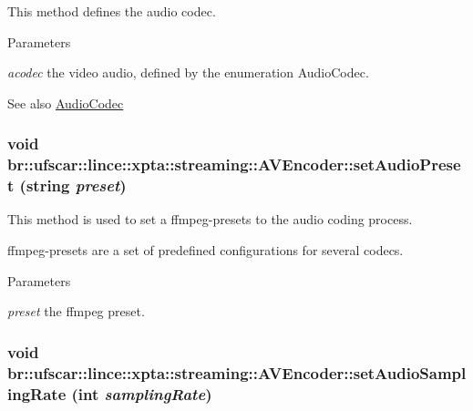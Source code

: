 This method defines the audio codec. 


\begin{DoxyParams}{Parameters}
\item[{\em acodec}]the video audio, defined by the enumeration AudioCodec. \end{DoxyParams}
\begin{DoxySeeAlso}{See also}
\hyperlink{namespacebr_1_1ufscar_1_1lince_1_1xpta_1_1streaming_afc25fb5f7c0f63197ec25d8d9de19b01}{AudioCodec} 
\end{DoxySeeAlso}
\hypertarget{classbr_1_1ufscar_1_1lince_1_1xpta_1_1streaming_1_1AVEncoder_a65d94849c6d727a0612d6db3909e7abe}{
\subsubsection[{setAudioPreset}]{\setlength{\rightskip}{0pt plus 5cm}void br::ufscar::lince::xpta::streaming::AVEncoder::setAudioPreset (string {\em preset})}}
\label{classbr_1_1ufscar_1_1lince_1_1xpta_1_1streaming_1_1AVEncoder_a65d94849c6d727a0612d6db3909e7abe}


This method is used to set a ffmpeg-\/presets to the audio coding process. 

ffmpeg-\/presets are a set of predefined configurations for several codecs. 
\begin{DoxyParams}{Parameters}
\item[{\em preset}]the ffmpeg preset. \end{DoxyParams}
\hypertarget{classbr_1_1ufscar_1_1lince_1_1xpta_1_1streaming_1_1AVEncoder_ad26256a91e67d240cba5f520e18f1800}{
\subsubsection[{setAudioSamplingRate}]{\setlength{\rightskip}{0pt plus 5cm}void br::ufscar::lince::xpta::streaming::AVEncoder::setAudioSamplingRate (int {\em samplingRate})}}
\label{classbr_1_1ufscar_1_1lince_1_1xpta_1_1streaming_1_1AVEncoder_ad26256a91e67d240cba5f520e18f1800}


